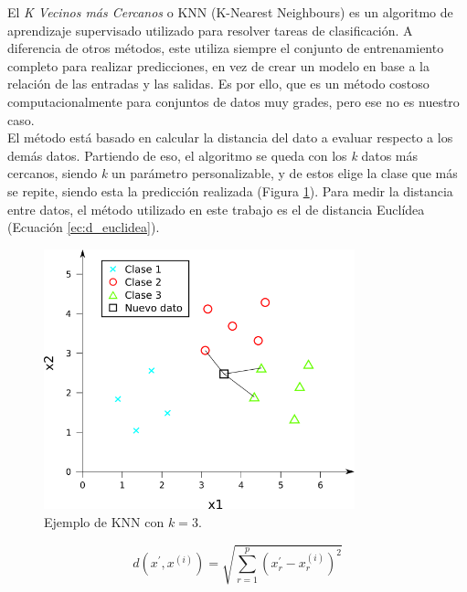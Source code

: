 El \textit{K Vecinos más Cercanos} o KNN (K-Nearest Neighbours) es un algoritmo de aprendizaje supervisado utilizado para resolver tareas de clasificación. A diferencia de otros métodos, este utiliza siempre el conjunto de entrenamiento completo para realizar predicciones, en vez de crear un modelo en base a la relación de las entradas y las salidas. Es por ello, que es un método costoso computacionalmente para conjuntos de datos muy grades, pero ese no es nuestro caso.\\

El método está basado en calcular la distancia del dato a evaluar respecto a los demás datos. Partiendo de eso, el algoritmo se queda con los \textit{k} datos más cercanos, siendo \textit{k} un parámetro personalizable, y de estos elige la clase que más se repite, siendo esta la predicción realizada (Figura \ref{fig:knn}). Para medir la distancia entre datos, el método utilizado en este trabajo es el de distancia Euclídea (Ecuación \ref{ec:d_euclidea}).\\

\begin{figure} [h!]
  \begin{center}
    \includegraphics[width=9cm]{figs/knn.png}
  \end{center}
  \captionsetup{justification=centering}
  \caption{Ejemplo de KNN con $k = 3$.}
  \label{fig:knn}
\end{figure}

\begin{myequation}[h]
\begin{equation}
d(x^{\prime}, x^{(i)}) = \sqrt{\sum_{r=1}^{p}(x_{r}^{\prime}-x_{r}^{(i)})^{2}}
\nonumber
\label{ec:d_euclidea}
\end{equation}
\captionsetup{justification=centering}
\caption[Distancia Euclídea de un vector $x^{\prime}$ con \textit{p} características respecto al vector i-ésimo $(x^{(i)})$]{Distancia Euclídea de un vector $x^{\prime}$ \\
con \textit{p} características respecto al vector i-ésimo $(x^{(i)})$}
\end{myequation} 

